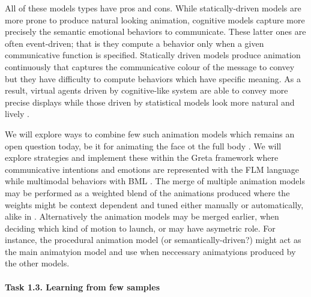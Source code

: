 All of these models types have pros and cons. While statically-driven models are more prone to produce natural looking animation, cognitive
models capture more precisely the semantic emotional behaviors to communicate. These latter ones are often event-driven; that is they compute a behavior only when a given communicative function is specified. Statically driven models produce animation continuously that captures the communicative colour of the message to convey but they have difficulty to compute behaviors which have specific meaning. As a result, virtual agents driven by cognitive-like system are able to convey more precise displays while those driven by statistical models look more natural and lively \cite{DBLP:conf/iva/LeeM12}.

We will explore ways to combine few such animation models which remains an open question today, be it for animating the face ot the full body \cite{...}. We will explore strategies and implement these within the Greta framework where communicative intentions and emotions are represented with the FLM language while multimodal behaviors with BML \cite{DBLP:conf/iva/VilhjalmssonCCCKKMMMPRTWW07}. The merge of multiple animation models may be performed as a weighted blend of the animations produced where the weights might be context dependent and tuned either manually or automatically, alike in \cite{DBLP:journals/tvcg/ShoulsonMKB14}. Alternatively the animation models may be merged earlier, when deciding which kind of motion to launch, or may have asymetric role. For instance, the procedural animation model (or semantically-driven?) might act as the main animatyion model and use when neccessary animatyions produced by the other models.




% 
% 

\paragraph{Task 1.3. Learning from few samples}

